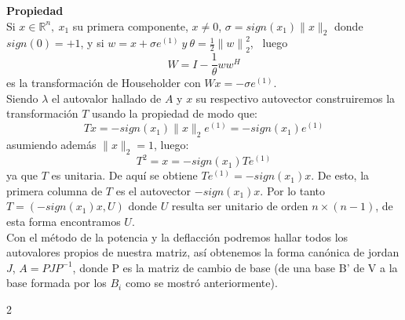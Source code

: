 \documentclass[12pt,a4paper]{article}
\begin{document}
\begin{multicols}{2}
\noindent\textbf{Propiedad}\\
\noindent Si $x \in\mathbb{R}^n, \ x_{1}$ su primera componente, $x\neq0$, $ \sigma=sign(x_{1})\|x\|_{2}$ donde $sign(0)=+1$, y si $w=x+\sigma e^{(1)} \ y \ \theta=\frac{1}{2}{\|w\|}^{2}_{2}$, \ luego $$W=I-\frac{1}{\theta}ww^{H}$$ es la transformación de Householder con $Wx=-\sigma e^{(1)}$.\\
Siendo $\lambda$ el autovalor hallado de $A$ y $x$ su respectivo autovector construiremos la transformación $T$ usando la propiedad de modo que:  $$Tx=-sign(x_{1})\|x\|_{2}e^{(1)}=-sign(x_{1})e^{(1)}$$ asumiendo además $\|x\|_{2}=1$, luego:\\
$$T^{2}=x=-sign(x_{1})Te^{(1)}$$ya que $T$ es unitaria. De aquí se obtiene $Te^{(1)}=-sign(x_{1})x$. De esto, la primera columna de $T$ es el autovector $-sign(x_{1})x$. Por lo tanto $T=(-sign(x_{1})x,U)$ donde $U$ resulta ser unitario de orden $n\times(n-1)$, de esta forma encontramos $U$. \\

\noindent Con el método de la potencia y la deflacción podremos hallar todos los autovalores propios de nuestra matriz, así obtenemos la forma canónica de jordan $J$, $A=PJP^{-1}$, donde P es la matriz de cambio de base (de una base B' de V a la base formada por los $B_{i}$ como se mostró anteriormente).
\end{multicols}{2}
\newpage
\end{document}
